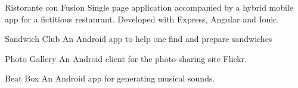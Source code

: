 \begin{cventries}
	\cventry
	{\faAndroid \faLaptop\enspace Ristorante con Fusion
	}
	{}
	{}
	{}
	{Single page application accompanied by a hybrid mobile app for a fictitious restaurant. Developed with Express, Angular and Ionic.}

	\cventry
	{\faAndroid\enspace Sandwich Club}
	{}
	{}
	{}
	{An Android app to help one find and prepare sandwiches}
			
	

	
	\cventry
	{\faAndroid\enspace Photo Gallery}
	{}
	{}
	{}
	{An Android client for the photo-sharing site Flickr.}
	
	\cventry
	{\faAndroid\enspace Beat Box}
	{}
	{}
	{}
	{An Android app for generating musical sounds.}
		
		
		
		



\end{cventries}
